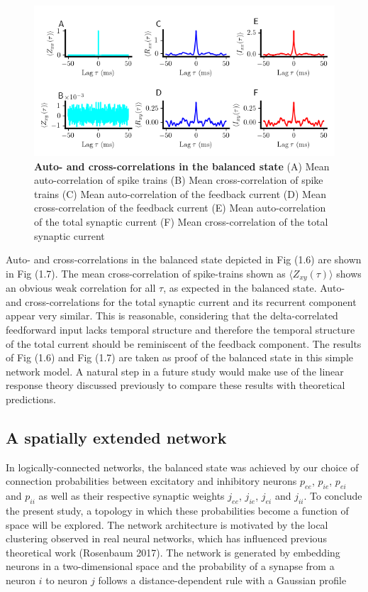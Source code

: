 \documentclass{ucetd}
\begin{document}
\begin{figure}[t!]
\centering
\includegraphics[width=165mm]{figure-12}
\caption{\textbf{Auto- and cross-correlations in the balanced state} (A) Mean auto-correlation of spike trains (B) Mean cross-correlation of spike trains (C) Mean auto-correlation of the feedback current (D) Mean cross-correlation of the feedback current (E) Mean auto-correlation of the total synaptic current (F) Mean cross-correlation of the total synaptic current}
\end{figure}

Auto- and cross-correlations in the balanced state depicted in Fig (1.6) are shown in Fig (1.7). The mean cross-correlation of spike-trains shown as $\langle Z_{xy}(\tau)\rangle$ shows an obvious weak correlation for all $\tau$, as expected in the balanced state. Auto- and cross-correlations for the total synaptic current and its recurrent component appear very similar. This is reasonable, considering that the delta-correlated feedforward input lacks temporal structure and therefore the temporal structure of the total current should be reminiscent of the feedback component. The results of Fig (1.6) and Fig (1.7) are taken as proof of the balanced state in this simple network model. A natural step in a future study would make use of the linear response theory discussed previously to compare these results with theoretical predictions. 

\subsection{A spatially extended network}


In logically-connected networks, the balanced state was achieved by our choice of connection probabilities between excitatory and inhibitory neurons $p_{ee}$, $p_{ie}$, $p_{ei}$ and $p_{ii}$ as well as their respective synaptic weights $j_{ee}$, $j_{ie}$, $j_{ei}$ and $j_{ii}$.  To conclude the present study, a topology in which these probabilities become a function of space will be explored. The network architecture is motivated by the local clustering observed in real neural networks, which has influenced previous theoretical work (Rosenbaum 2017). The network is generated by embedding neurons in a two-dimensional space and the probability of a synapse from a neuron $i$ to neuron $j$ follows a distance-dependent rule with a Gaussian profile
\end{document}
